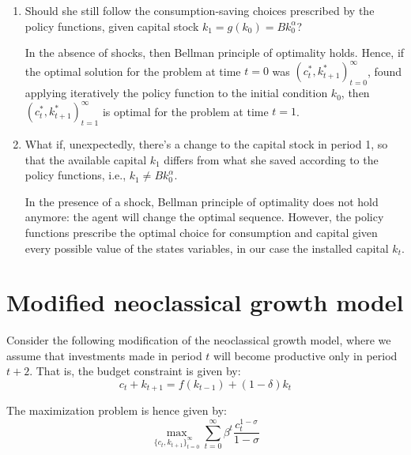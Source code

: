 \documentclass[dvipsnames,11pt]{article}
\begin{document}
                \begin{enumerate}
                    \item[a.] Should she still follow the consumption-saving choices prescribed by the policy functions, given capital stock $k_1 = g(k_0) = B k_0^\alpha$? 

                        \begin{solution}
                        In the absence of shocks, then Bellman principle of optimality holds. Hence, if the optimal solution for the problem at time $t=0$ was $(c_t^*,k_{t+1}^*)_{t=0}^\infty$, found applying iteratively the policy function to the initial condition $k_0$, then $(c^*_t,k_{t+1}^*)_{t=1}^\infty$ is optimal for the problem at time $t=1$.\end{solution}
                    
                    \item[b.] What if, unexpectedly, there's a change to the capital stock in period 1, so that the available capital $k_1$ differs from what she saved according to the policy functions, i.e., $k_1 \neq B k_0^\alpha$.

                        \begin{solution}
                        In the presence of a shock, Bellman principle of optimality does not hold anymore: the agent will change the optimal sequence. However, the policy functions prescribe the optimal choice for consumption and capital given every possible value of the states variables, in our case the installed capital $k_t$.      \end{solution}
                        
                \end{enumerate}
                


\section{Modified neoclassical growth model}

    Consider the following modification of the neoclassical growth model, where we assume that investments made in period $t$ will become productive only in period $t + 2$. That is, the budget constraint is given by:
    \begin{equation}
        c_t + k_{t+1} = f(k_{t-1}) + (1 - \delta) k_t
    \end{equation}
    
    \noindent The maximization problem is hence given by:
    \begin{equation}
        \max_{\{c_t, k_{t+1}\}_{t=0}^\infty} \sum_{t=0}^{\infty} \beta^t \frac{c_t^{1-\sigma}}{1-\sigma}
    \end{equation}
    
\end{document}
